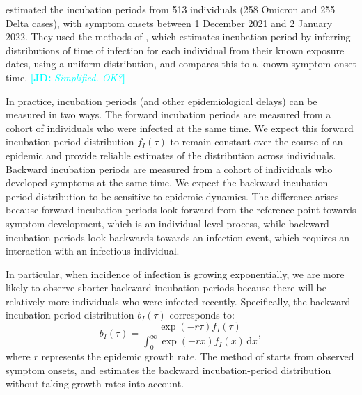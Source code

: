 \documentclass[12pt]{article}
\newcommand{\comment}{\showcomment}
\newcommand{\showcomment}[3]{\textcolor{#1}{\textbf{[#2: }\textsl{#3}\textbf{]}}}
\newcommand{\jd}[1]{\comment{cyan}{JD}{#1}}
\newcommand{\dd}[1]{\ensuremath{\, \mathrm{d}#1}}
\newcommand{\dx}{\dd{x}}
\begin{document}
\cite{backer2021omicron} estimated the incubation periods from 513 individuals (258 Omicron and 255 Delta cases), with symptom onsets between 1 December 2021 and 2 January 2022.
They used the methods of \cite{backer2020incubation}, which estimates incubation period by inferring distributions of time of infection for each individual from their known exposure dates, using a uniform distribution, and compares this to a known symptom-onset time.
\jd{Simplified. OK?}

In practice, incubation periods (and other epidemiological delays) can be measured in two ways.
The forward incubation periods are measured from a cohort of individuals who were infected at the same time. 
We expect this forward incubation-period distribution $f_I(\tau)$ to remain constant over the course of an epidemic and provide reliable estimates of the distribution across individuals. 
Backward incubation periods are measured from a cohort of individuals who developed symptoms at the same time. 
We expect the backward incubation-period distribution to be sensitive to epidemic dynamics.
The difference arises because forward incubation periods look forward from the reference point towards symptom development, which is an individual-level process, while backward incubation periods look backwards towards an infection event, which requires an interaction with an infectious individual.

In particular, when incidence of infection is growing exponentially, we are more likely to observe shorter backward incubation periods because there will be relatively more individuals who were infected recently.
Specifically, the backward incubation-period distribution $b_I(\tau)$ corresponds to:
\begin{equation}
b_I(\tau) =\frac{ \exp(-r\tau) f_I(\tau)}{\int_0^\infty \exp(-r x) f_I(x)  \dx},
\label{eq:backward}
\end{equation}
where $r$ represents the epidemic growth rate.
The method of \cite{backer2020incubation} starts from observed symptom onsets, and estimates the backward incubation-period distribution without taking growth rates into account.
\end{document}
